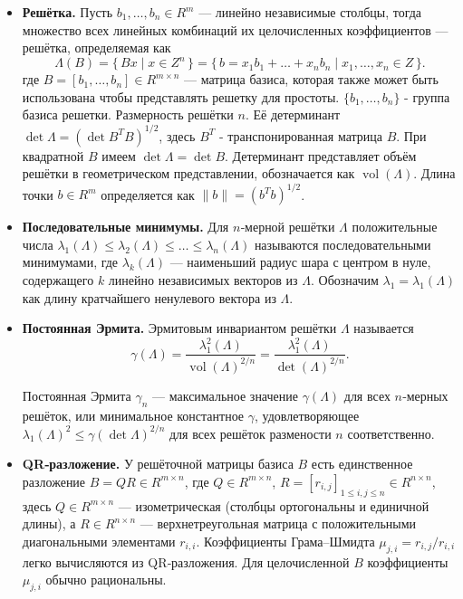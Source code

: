 \begin{itemize}
\item \textbf{Решётка.} Пусть $b_{1},\ldots,b_{n}\in R^{m}$ — линейно
        независимые столбцы, тогда множество всех линейных комбинаций их
        целочисленных коэффициентов — решётка, определяемая как
        \begin{equation} \Lambda(B) =\{\,Bx \mid x\in Z^{n}\,\} =\{\,b =
            x_{1}b_{1}+\dots+x_{n}b_{n} \mid x_{1},\dots,x_{n}\in Z\,\}.
        \end{equation} где $B=[b_{1},\ldots,b_{n}]\in R^{m\times n}$ — матрица
        базиса, которая также может быть использована чтобы представлять
        решетку для простоты. $\{b_1, \ldots, b_n\}$ - группа базиса решетки.
        Размерность решётки $n$. Её детерминант $\det\Lambda=(\det
        B^{T}B)^{1/2}$, здесь $B^T$ - транспонированная матрица $B$. При
        квадратной $B$ имеем $\det\Lambda=\det B$. Детерминант представляет
        объём решётки в геометрическом представлении, обозначается как
        $\operatorname{vol}(\Lambda)$. Длина точки $b\in R^{m}$ определяется
        как $\lVert b\rVert=(b^{T}b)^{1/2}$.

\item \textbf{Последовательные минимумы.} Для $n$‑мерной решётки $\Lambda$
        положительные числа $\lambda_{1}(\Lambda)\le\lambda_{2}(\Lambda)
        \le\dots\le\lambda_{n}(\Lambda)$ называются последовательными
        минимумами, где $\lambda_{k}(\Lambda)$ — наименьший радиус шара с
        центром в нуле, содержащего $k$ линейно независимых векторов из
        $\Lambda$. Обозначим $\lambda_{1}=\lambda_{1}(\Lambda)$ как длину
        кратчайшего ненулевого вектора из $\Lambda$.

\item \textbf{Постоянная Эрмита.} Эрмитовым инвариантом решётки $\Lambda$
        называется
        \begin{equation}
          \gamma(\Lambda)
          = \frac{\lambda_{1}^{2}(\Lambda)}{\operatorname{vol}(\Lambda)^{2/n}}
          = \frac{\lambda_{1}^{2}(\Lambda)}{\det(\Lambda)^{2/n}}.
        \end{equation}

        Постоянная Эрмита $\gamma_{n}$ — максимальное значение $\gamma(\Lambda)$
        для всех $n$‑мерных решёток, или минимальное константное $\gamma$,
        удовлетворяющее $\lambda_{1}(\Lambda)^{2}\le\gamma(\det\Lambda)^{2/n}$
        для всех решёток размености $n$ соответственно.

\item \textbf{QR‑разложение.} У решёточной матрицы базиса $B$ есть единственное
        разложение $B=QR\in R^{m\times n}$, где $Q\in R^{m\times n}$,
        $R=[r_{i,j}]_{1\le i,j\le n} \in R^{n\times n}$, здесь $Q\in R^{m\times
        n}$ — изомет­рическая (столбцы ортогональны и единичной длины), а $R
        \in R^{n\times n}$ — верхнетреугольная матрица с положительными
        диагональными элементами $r_{i,i}$. Коэффициенты Грама–Шмидта
        $\mu_{j,i}=r_{i,j}/r_{i,i}$ легко вычисляются из QR‑разложения. Для
        целочисленной $B$ коэффициенты $\mu_{j,i}$ обычно рациональны.


\end{itemize}
